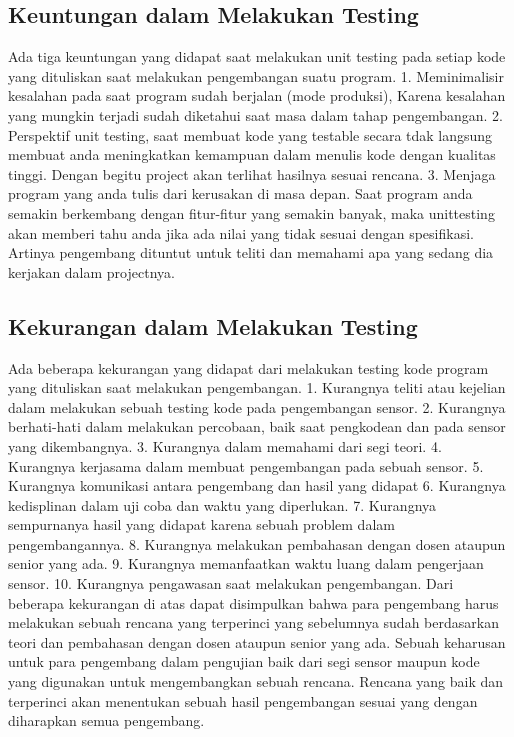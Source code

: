 \documentclass{article}
\begin{document}
\subsection {Keuntungan dalam Melakukan Testing}
Ada tiga keuntungan yang didapat saat melakukan unit testing pada setiap kode yang dituliskan saat melakukan pengembangan suatu program.
1.	Meminimalisir kesalahan pada saat program sudah berjalan (mode produksi), Karena kesalahan yang mungkin terjadi sudah diketahui saat masa dalam tahap pengembangan.
2.	Perspektif unit testing, saat membuat kode yang testable secara tdak langsung membuat anda meningkatkan kemampuan dalam menulis kode dengan kualitas tinggi. Dengan begitu project akan terlihat hasilnya sesuai rencana.
3.	Menjaga program yang anda tulis dari kerusakan di masa depan. Saat program anda semakin berkembang dengan fitur-fitur yang semakin banyak, maka unittesting akan memberi tahu anda jika ada nilai yang tidak sesuai dengan spesifikasi. Artinya pengembang dituntut untuk teliti dan memahami apa yang sedang dia kerjakan dalam projectnya.

\subsection {Kekurangan dalam Melakukan Testing}
Ada beberapa kekurangan yang didapat dari melakukan testing kode program yang dituliskan saat melakukan pengembangan.
1.	Kurangnya teliti atau kejelian dalam melakukan sebuah testing kode pada pengembangan sensor.
2.	Kurangnya berhati-hati dalam melakukan percobaan, baik saat pengkodean dan pada sensor yang dikembangnya.
3.	Kurangnya dalam memahami dari segi teori.
4.	Kurangnya kerjasama dalam membuat pengembangan pada sebuah sensor.
5.	Kurangnya komunikasi antara pengembang dan hasil yang didapat
6.	Kurangnya kedisplinan dalam uji coba dan waktu yang diperlukan.
7.	Kurangnya sempurnanya hasil yang didapat karena sebuah problem dalam pengembangannya.
8.	Kurangnya melakukan pembahasan dengan dosen ataupun senior yang ada.
9.	Kurangnya memanfaatkan waktu luang dalam pengerjaan sensor.
10.	Kurangnya pengawasan saat melakukan pengembangan.
Dari beberapa kekurangan di atas dapat disimpulkan bahwa para pengembang harus melakukan sebuah rencana yang terperinci yang sebelumnya sudah berdasarkan teori dan pembahasan dengan dosen ataupun senior yang ada. Sebuah keharusan untuk para pengembang dalam pengujian baik dari segi sensor maupun kode yang digunakan untuk mengembangkan sebuah rencana.
Rencana yang baik dan terperinci akan menentukan sebuah hasil pengembangan sesuai yang dengan diharapkan semua pengembang.
\end{document}
